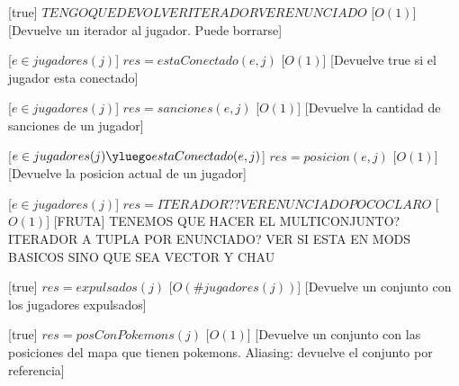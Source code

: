 \begin{Interfaz}
%
[true]
{$TENGO QUE DEVOLVER ITERADOR VER ENUNCIADO$}%
[$O(1)$] %
[Devuelve un iterador al jugador. Puede borrarse]



%
[$e \in jugadores(j)$]
{$res = estaConectado(e, j)$}%
[$O(1)$] %
[Devuelve true si el jugador esta conectado]



%
[$e \in jugadores(j)$]
{$res = sanciones(e, j)$}%
[$O(1)$] %
[Devuelve la cantidad de sanciones de un jugador]



%
[$e \in jugadores(j)  \yluego estaConectado(e, j)$]
{$res = posicion(e, j)$}%
[$O(1)$] %
[Devuelve la posicion actual de un jugador]



%
[$e \in jugadores(j)$]
{$res = ITERADOR?? VER ENUNCIADO POCO CLARO$}%
[$O(1)$] %
[FRUTA]
{TENEMOS QUE HACER EL MULTICONJUNTO? ITERADOR A TUPLA POR ENUNCIADO? VER SI ESTA EN MODS BASICOS SINO QUE SEA VECTOR Y CHAU}



%
[true]
{$res = expulsados(j)$}%
[$O(\#jugadores(j))$] %
[Devuelve un conjunto con los jugadores expulsados]


%
[true]
{$res = posConPokemons(j)$}%
[$O(1)$] %
[Devuelve un conjunto con las posiciones del mapa que tienen pokemons. Aliasing: devuelve el conjunto por referencia]




\end{Interfaz}

